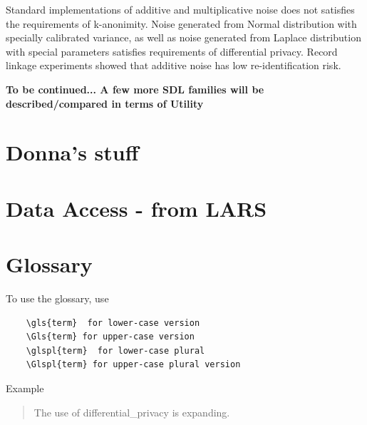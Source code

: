 \documentclass[12pt]{article}
\begin{document}
Standard implementations of additive and multiplicative noise does not satisfies the requirements of k-anonimity.
Noise generated from Normal distribution with specially calibrated variance, as well as noise generated from Laplace distribution with special parameters  satisfies requirements of  differential privacy.
Record linkage experiments showed that additive noise has low re-identification risk.



{\bf To be continued... A few more SDL families will be described/compared in terms of Utility}
 
\section{Donna's stuff}

\section{Data Access - from LARS}


%



\section*{Glossary}
To use the glossary, use 
\begin{verbatim}
    \gls{term}  for lower-case version
    \Gls{term} for upper-case version
    \glspl{term}  for lower-case plural
    \Glspl{term} for upper-case plural version
\end{verbatim}
Example
\begin{quote}
    The use of \gls{differential_privacy} is expanding.
\end{quote}

\glsaddall
\printglossary
\end{document}
